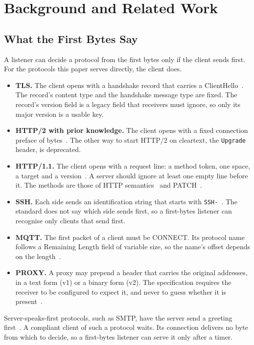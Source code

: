 \section{Background and Related Work}\label{sec:related}

\subsection{What the First Bytes Say}\label{sec:signatures}

A listener can decide a protocol from the first bytes only if the client sends first. For the
protocols this paper serves directly, the client does.
\begin{itemize}
\item \textbf{TLS.} The client opens with a handshake record that carries a
ClientHello~\cite{rescorla2018rfc8446}. The record's content type and the handshake message type
are fixed. The record's version field is a legacy field that receivers must ignore, so only its
major version is a usable key.
\item \textbf{HTTP/2 with prior knowledge.} The client opens with a fixed connection preface of
\HtwocNeed{} bytes~\cite{thomson2022rfc9113}. The other way to start HTTP/2 on cleartext, the
\texttt{Upgrade} header, is deprecated.
\item \textbf{HTTP/1.1.} The client opens with a request line: a method token, one space, a
target and a version~\cite{fielding2022rfc9112}. A server should ignore at least one empty line
before it. The methods are those of HTTP semantics~\cite{fielding2022rfc9110} and
PATCH~\cite{dusseault2010rfc5789}.
\item \textbf{SSH.} Each side sends an identification string that starts with
\texttt{SSH-}~\cite{ylonen2006rfc4253}. The standard does not say which side sends first, so a
first-bytes listener can recognise only clients that send first.
\item \textbf{MQTT.} The first packet of a client must be CONNECT. Its protocol name follows a
Remaining Length field of variable size, so the name's offset depends on the
length~\cite{banks2014mqtt311,banks2019mqtt5}.
\item \textbf{PROXY.} A proxy may prepend a header that carries the original addresses, in a text
form (v1) or a binary form (v2). The specification requires the receiver to be
configured to expect it, and never to guess whether it is present~\cite{tarreau2026proxy}.
\end{itemize}
Server-speaks-first protocols, such as SMTP, have the server send a greeting
first~\cite{klensin2008rfc5321}. A compliant client of such a protocol waits. Its connection
delivers no byte from which to decide, so a first-bytes listener can serve it only after a timer.

